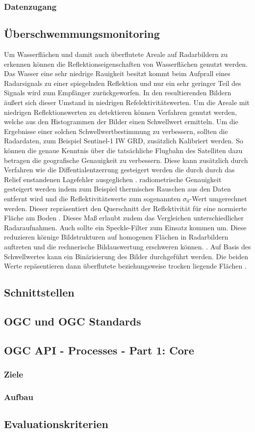 \subsubsection{Datenzugang}
\subsection{Überschwemmungsmonitoring}
Um Wasserflächen und damit auch überflutete Areale auf Radarbildern zu erkennen können die Reflektionseigenschaften von Wasserflächen genutzt werden. Das Wasser eine 
sehr niedrige Rauigkeit besitzt kommt beim Aufprall eines Radarsignals zu einer spiegelnden Reflektion und nur ein sehr geringer Teil des Signals wird zum Empfänger 
zurückgeworfen. In den resultierenden Bildern äußert sich dieser Umstand in niedrigen Refelektivitätswerten. 
Um die Areale mit niedrigen Reflektionswerten zu detektieren können Verfahren genutzt werden, welche aus den Histogrammen der Bilder einen Schwellwert ermitteln.
Um die Ergebnisse einer solchen Schwellwertbestimmung zu verbessern, sollten die Radardaten, zum Beispiel Sentinel-1 IW GRD, zusätzlich Kalibriert werden. 
So können die genaue Kenntnis über die tatsächliche Flugbahn des Satelliten dazu betragen die geografische Genauigkeit zu verbessern. Diese kann zusätzlich durch Verfahren 
wie die Diffentialentzerrung gesteigert werden die durch durch das Relief enstandenen Lagefehler ausgeglichen \cite{einfuehrung_in_fernerkundung}.
radiometrische Genauigkeit gesteigert werden indem zum Beispiel thermisches Rauschen aus den Daten entfernt wird und die Reflektivitätswerte zum 
sogenannten $\sigma_0$-Wert umgerechnet werden. Dieser repräsentiert den Querschnitt der Reflektivität für eine normierte Fläche am Boden \cite{radiometric_calibration_of_S1_level1_products}.
Dieses Maß erlaubt zudem das Vergleichen unterschiedlicher Radaraufnahmen.  
Auch sollte ein Speckle-Filter zum Einsatz kommen um. Diese reduzieren körnige Bildstrukturen auf homogenen Flächen in Radarbildern auftreten und die 
rechnerische Bildauswertung erschweren können. \cite{einfuehrung_in_fernerkundung}\cite{sentinel_1_flood_mapping_tutorial}.  
Auf Basis des Schwellwertes kann ein Binärisierung des Bilder durchgeführt werden. Die beiden Werte repäsentieren dann überflutete beziehungsweise trocken liegende 
Flächen \cite{sentinel_1_flood_mapping_tutorial}.
\subsection{Schnittstellen}
\subsection{OGC und OGC Standards}
\subsection{OGC API - Processes - Part 1: Core}
\subsubsection{Ziele}
\subsubsection{Aufbau}
\subsection{Evaluationskriterien}


